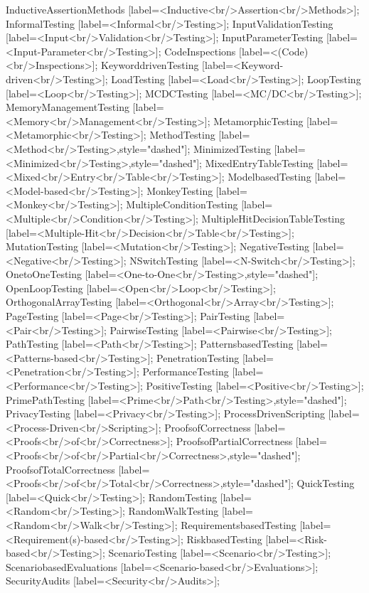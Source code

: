 \documentclass{article}
\begin{document}
{InductiveAssertionMethods [label=<Inductive<br/>Assertion<br/>Methods>];
InformalTesting [label=<Informal<br/>Testing>];
InputValidationTesting [label=<Input<br/>Validation<br/>Testing>];
InputParameterTesting [label=<Input-Parameter<br/>Testing>];
CodeInspections [label=<(Code)<br/>Inspections>];
KeyworddrivenTesting [label=<Keyword-driven<br/>Testing>];
LoadTesting [label=<Load<br/>Testing>];
LoopTesting [label=<Loop<br/>Testing>];
MCDCTesting [label=<MC/DC<br/>Testing>];
MemoryManagementTesting [label=<Memory<br/>Management<br/>Testing>];
MetamorphicTesting [label=<Metamorphic<br/>Testing>];
MethodTesting [label=<Method<br/>Testing>,style="dashed"];
MinimizedTesting [label=<Minimized<br/>Testing>,style="dashed"];
MixedEntryTableTesting [label=<Mixed<br/>Entry<br/>Table<br/>Testing>];
ModelbasedTesting [label=<Model-based<br/>Testing>];
MonkeyTesting [label=<Monkey<br/>Testing>];
MultipleConditionTesting [label=<Multiple<br/>Condition<br/>Testing>];
MultipleHitDecisionTableTesting [label=<Multiple-Hit<br/>Decision<br/>Table<br/>Testing>];
MutationTesting [label=<Mutation<br/>Testing>];
NegativeTesting [label=<Negative<br/>Testing>];
NSwitchTesting [label=<N-Switch<br/>Testing>];
OnetoOneTesting [label=<One-to-One<br/>Testing>,style="dashed"];
OpenLoopTesting [label=<Open<br/>Loop<br/>Testing>];
OrthogonalArrayTesting [label=<Orthogonal<br/>Array<br/>Testing>];
PageTesting [label=<Page<br/>Testing>];
PairTesting [label=<Pair<br/>Testing>];
PairwiseTesting [label=<Pairwise<br/>Testing>];
PathTesting [label=<Path<br/>Testing>];
PatternsbasedTesting [label=<Patterns-based<br/>Testing>];
PenetrationTesting [label=<Penetration<br/>Testing>];
PerformanceTesting [label=<Performance<br/>Testing>];
PositiveTesting [label=<Positive<br/>Testing>];
PrimePathTesting [label=<Prime<br/>Path<br/>Testing>,style="dashed"];
PrivacyTesting [label=<Privacy<br/>Testing>];
ProcessDrivenScripting [label=<Process-Driven<br/>Scripting>];
ProofsofCorrectness [label=<Proofs<br/>of<br/>Correctness>];
ProofsofPartialCorrectness [label=<Proofs<br/>of<br/>Partial<br/>Correctness>,style="dashed"];
ProofsofTotalCorrectness [label=<Proofs<br/>of<br/>Total<br/>Correctness>,style="dashed"];
QuickTesting [label=<Quick<br/>Testing>];
RandomTesting [label=<Random<br/>Testing>];
RandomWalkTesting [label=<Random<br/>Walk<br/>Testing>];
RequirementsbasedTesting [label=<Requirement(s)-based<br/>Testing>];
RiskbasedTesting [label=<Risk-based<br/>Testing>];
ScenarioTesting [label=<Scenario<br/>Testing>];
ScenariobasedEvaluations [label=<Scenario-based<br/>Evaluations>];
SecurityAudits [label=<Security<br/>Audits>];
}
\end{document}
